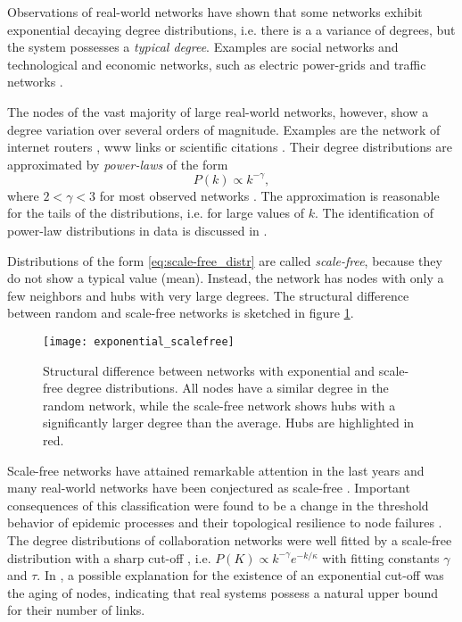 Observations of real-world networks have shown that some networks exhibit exponential decaying degree distributions, i.e. there is a a variance of degrees, but the system possesses a \emph{typical degree}.
Examples are social networks and technological and economic networks, such as electric power-grids and traffic networks \citep{Amaral:2000,indian_railway}.

The nodes of the vast majority of large real-world networks, however, show a degree variation over several orders of magnitude.
Examples are the network of internet routers \citep{Faloutsos:1999}, www links \citep{Barabasi99} or scientific citations \citep{Price:1965}.
Their degree distributions are approximated by \emph{power-laws} of the form
\begin{equation}\label{eq:scale-free_distr}
P(k) \propto k^{-\gamma } ,
\end{equation}
where $2<\gamma <3$ for most observed networks \citep{all_scale_free_are_sparse,Newman2003}.
The approximation is reasonable for the tails of the distributions, i.e. for large values of $k$.
The identification of power-law distributions in data is discussed in \citep{Clauset:2009}.

Distributions of the form \eqref{eq:scale-free_distr} are called \emph{scale-free}, because they do not show a typical value (mean).
Instead, the network has nodes with only a few neighbors and hubs with very large degrees.
The structural difference between random and scale-free networks is sketched in figure \ref{fig:random_scalefree}.
%
\begin{figure}[htbp]
\begin{center}
\texttt{[image: exponential\_scalefree]}
\caption{Structural difference between networks with exponential and scale-free degree distributions.
All nodes have a similar degree in the random network, while the scale-free network shows hubs with a significantly larger degree than the average.
Hubs are highlighted in red.}
\label{fig:random_scalefree}
\end{center}
\end{figure}

Scale-free networks have attained remarkable attention in the last years and many real-world networks have been conjectured as scale-free \citep{Newman2003,Barabasi99}.
Important consequences of this classification were found to be a change in the threshold behavior of epidemic processes \citep{Pastor-Satorras_vespi:2001} and their topological resilience to node failures \citep{Albert:2000}.
The degree distributions of collaboration networks were well fitted by a scale-free distribution with a sharp cut-off \citep{Newman:2001p,Albert:2000}, i.e. $P(K)\propto k^{-\gamma }e^{-k/\kappa }$ with fitting constants $\gamma $ and $\tau $.
In \citep{Amaral:2000}, a possible explanation for the existence of an exponential cut-off was the aging of nodes, indicating that real systems possess a natural upper bound for their number of links.



